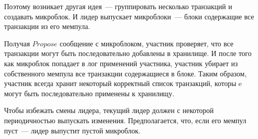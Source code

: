 Поэтому возникает другая идея~--- группировать несколько транзакций и создавать микроблок. И лидер выпускает микроблоки~--- блоки содержащие все транзакции из его мемпула. 

Получая $Propose$ сообщение с микроблоком, участник проверяет, что все транзакции могут быть последовательно добавлены в хранилище.
И после того как микроблок попадает в лог применений участника, участник убирает из собственного мемпула все транзакции содержащиеся в блоке. Таким образом, участник всегда хранит некоторый корректный список транзакций, которы	e могут быть последовательно применены к хранилищу.

Чтобы избежать смены лидера, текущий лидер должен с некоторой периодичностью выпускать изменения. Предполагается, что, если его мемпул пуст~--- лидер выпустит пустой микроблок.

